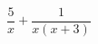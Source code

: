 \hspace*{2mm}\begin{minipage}[t]{\dimexpr\linewidth-2mm\relax}\vspace{0pt}
$\dfrac{5}{x}+\dfrac{1}{x(x+3)}$\end{minipage}
